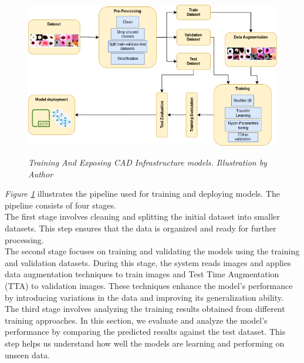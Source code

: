 \begin{figure}[H]
\centering
\includegraphics[width=\textwidth]{imatges/methodological_contribution/Pipeline.drawio.png}
\caption[Training And Exposing CAD Infrastructure models]{\textit{Training And Exposing CAD Infrastructure models. Illustration by Author}}
{\label{fig:cad-infrastructure-training-system}}
\end{figure}

\textit{Figure \ref{fig:cad-infrastructure-training-system}} illustrates the pipeline used for training and deploying models. The pipeline consists of four stages. \\

The first stage involves cleaning and splitting the initial dataset into smaller datasets. This step ensures that the data is organized and ready for further processing. \\

The second stage focuses on training and validating the models using the training and validation datasets. During this stage, the system reads images and applies data augmentation techniques to train images and Test Time Augmentation (TTA) to validation images. These techniques enhance the model's performance by introducing variations in the data and improving its generalization ability. \\

The third stage involves analyzing the training results obtained from different training approaches. In this section, we evaluate and analyze the model's performance by comparing the predicted results against the test dataset. This step helps us understand how well the models are learning and performing on unseen data. \\

